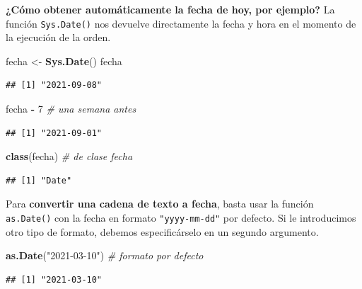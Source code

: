 \documentclass[11pt,]{book}
\newenvironment{Shaded}{\begin{snugshade}}{\end{snugshade}}
\newcommand{\CommentTok}[1]{\textcolor[rgb]{0.37,0.37,0.37}{\textit{#1}}}
\newcommand{\DecValTok}[1]{\textcolor[rgb]{0.06,0.06,0.06}{#1}}
\newcommand{\KeywordTok}[1]{\textcolor[rgb]{0.27,0.27,0.27}{\textbf{#1}}}
\newcommand{\NormalTok}[1]{#1}
\newcommand{\OperatorTok}[1]{\textcolor[rgb]{0.43,0.43,0.43}{\textbf{#1}}}
\newcommand{\StringTok}[1]{\textcolor[rgb]{0.5,0.5,0.5}{#1}}
\begin{document}
\textbf{¿Cómo obtener automáticamente la fecha de hoy, por ejemplo?} La función \texttt{Sys.Date()} nos devuelve directamente la fecha y hora en el momento de la ejecución de la orden.

\begin{Shaded}
\begin{Highlighting}[]
\NormalTok{fecha <-}\StringTok{ }\KeywordTok{Sys.Date}\NormalTok{()}
\NormalTok{fecha}
\end{Highlighting}
\end{Shaded}

\begin{verbatim}
## [1] "2021-09-08"
\end{verbatim}

\begin{Shaded}
\begin{Highlighting}[]
\NormalTok{fecha }\OperatorTok{-}\StringTok{ }\DecValTok{7} \CommentTok{# una semana antes}
\end{Highlighting}
\end{Shaded}

\begin{verbatim}
## [1] "2021-09-01"
\end{verbatim}

\begin{Shaded}
\begin{Highlighting}[]
\KeywordTok{class}\NormalTok{(fecha) }\CommentTok{# de clase fecha}
\end{Highlighting}
\end{Shaded}

\begin{verbatim}
## [1] "Date"
\end{verbatim}

Para \textbf{convertir una cadena de texto a fecha}, basta usar la función \texttt{as.Date()} con la fecha en formato \texttt{"yyyy-mm-dd"} por defecto. Si le introducimos otro tipo de formato, debemos especificárselo en un segundo argumento.

\begin{Shaded}
\begin{Highlighting}[]
\KeywordTok{as.Date}\NormalTok{(}\StringTok{"2021-03-10"}\NormalTok{) }\CommentTok{# formato por defecto}
\end{Highlighting}
\end{Shaded}

\begin{verbatim}
## [1] "2021-03-10"
\end{verbatim}
\end{document}
